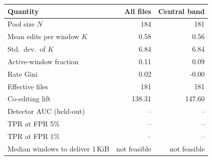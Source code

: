 \begin{tabular}{lrr}
\toprule
Quantity & All files & Central band\\
\midrule
Pool size $N$ & 184 & 181\\
Mean edits per window $K$ & 0.58 & 0.56\\
Std.\ dev.\ of $K$ & 6.84 & 6.84\\
Active-window fraction & 0.11 & 0.09\\
Rate Gini & 0.02 & -0.00\\
Effective files & 181 & 181\\
Co-editing lift & 138.31 & 147.60\\
Detector AUC (held-out) & -- & --\\
TPR at FPR 5\% & -- & --\\
TPR at FPR 1\% & -- & --\\
Median windows to deliver 1\,KiB & not feasible & not feasible\\
\bottomrule
\end{tabular}
